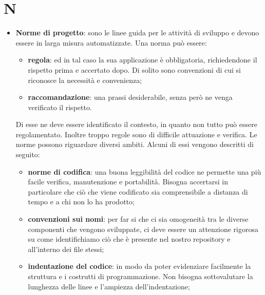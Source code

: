 %
%
%

\section{N} %
\label{sec:n}
	\begin{itemize}
		\item \textbf{Norme di progetto}: sono le linee guida per le attività di sviluppo e devono essere in larga misura automatizzate. Una norma può essere:
			\begin{itemize}
				\item \textbf{regola}: ed in tal caso la sua applicazione è obbligatoria, richiedendone il rispetto prima e accertato dopo. Di solito sono convenzioni di cui si riconosce la necessità e convenienza;
				\item \textbf{raccomandazione}: una prassi desiderabile, senza però ne venga verificato il rispetto.
			\end{itemize}
			\noindent \newline
		Di esse ne deve essere identificato il contesto, in quanto non tutto può essere regolamentato. Inoltre troppo regole sono di difficile attuazione e verifica. \newline
		Le norme possono riguardare diversi ambiti. Alcuni di essi vengono descritti di seguito:
			\begin{itemize}
				\item \textbf{norme di codifica}: una buona leggibilità del codice ne permette una più facile verifica, manutenzione e portabilità. Bisogna accertarsi in particolare che ciò che viene codificato sia comprensibile a distanza di tempo e a chi non lo ha prodotto;
				\item \textbf{convenzioni sui nomi}: per far si che ci sia omogeneità tra le diverse componenti che vengono sviluppate, ci deve essere un attenzione rigorosa su come identifichiamo ciò che è presente nel nostro repository e all'interno dei file stessi;
				\item \textbf{indentazione del codice}: in modo da poter evidenziare facilmente la struttura e i costrutti di programmazione. Non bisogna sottovalutare la lunghezza delle linee e l'ampiezza dell'indentazione;

\end{itemize}
\end{itemize}

